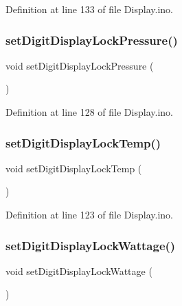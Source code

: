Definition at line 133 of file Display.\+ino.

\mbox{\label{_display_8ino_af8ac9a38946b4bc55424b64259d268af}} 
\subsubsection{\texorpdfstring{setDigitDisplayLockPressure()}{setDigitDisplayLockPressure()}}
{\footnotesize\ttfamily void set\+Digit\+Display\+Lock\+Pressure (\begin{DoxyParamCaption}{ }\end{DoxyParamCaption})}



Definition at line 128 of file Display.\+ino.

\mbox{\label{_display_8ino_a541697a8dce5fe9daf612f8ee30f5390}} 
\subsubsection{\texorpdfstring{setDigitDisplayLockTemp()}{setDigitDisplayLockTemp()}}
{\footnotesize\ttfamily void set\+Digit\+Display\+Lock\+Temp (\begin{DoxyParamCaption}{ }\end{DoxyParamCaption})}



Definition at line 123 of file Display.\+ino.

\mbox{\label{_display_8ino_a0622ff51a9ee6be2b6a1e4f2eddaee38}} 
\subsubsection{\texorpdfstring{setDigitDisplayLockWattage()}{setDigitDisplayLockWattage()}}
{\footnotesize\ttfamily void set\+Digit\+Display\+Lock\+Wattage (\begin{DoxyParamCaption}{ }\end{DoxyParamCaption})}



